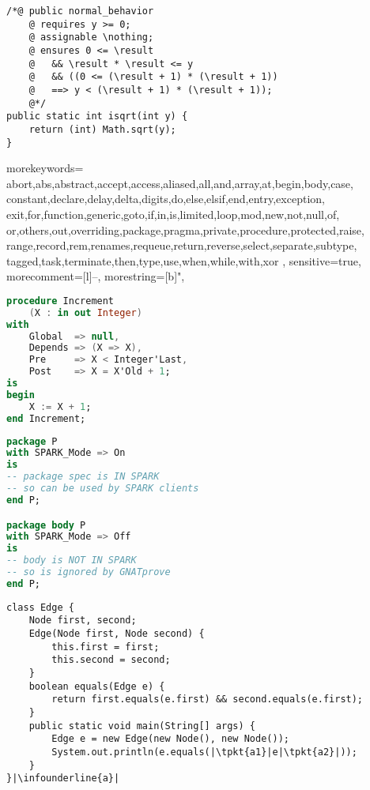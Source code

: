 \newsavebox{\jmlisqrt}
\begin{lrbox}{\jmlisqrt}
	\begin{lstlisting}
/*@ public normal_behavior
	@ requires y >= 0;
	@ assignable \nothing;
	@ ensures 0 <= \result
	@   && \result * \result <= y
	@   && ((0 <= (\result + 1) * (\result + 1))
	@   ==> y < (\result + 1) * (\result + 1));
	@*/
public static int isqrt(int y) {
	return (int) Math.sqrt(y);
}
	\end{lstlisting}
\end{lrbox}

 {
	morekeywords={
		abort,abs,abstract,accept,access,aliased,all,and,array,at,begin,body,case,
		constant,declare,delay,delta,digits,do,else,elsif,end,entry,exception,
		exit,for,function,generic,goto,if,in,is,limited,loop,mod,new,not,null,of,
		or,others,out,overriding,package,pragma,private,procedure,protected,raise,
		range,record,rem,renames,requeue,return,reverse,select,separate,subtype,
		tagged,task,terminate,then,type,use,when,while,with,xor
	},
	sensitive=true,
	morecomment=[l]--,
	morestring=[b]",
}

\newsavebox{\sparkincrement}
\begin{lrbox}{\sparkincrement}
	\begin{lstlisting}[language=ada]
procedure Increment
	(X : in out Integer)
with
	Global  => null,
	Depends => (X => X),
	Pre     => X < Integer'Last,
	Post    => X = X'Old + 1;
is
begin
	X := X + 1;
end Increment;
	\end{lstlisting}
\end{lrbox}

\newsavebox{\sparkmode}
\begin{lrbox}{\sparkmode}
	\begin{lstlisting}[language=ada]
package P
with SPARK_Mode => On
is
-- package spec is IN SPARK
-- so can be used by SPARK clients
end P;

package body P
with SPARK_Mode => Off
is
-- body is NOT IN SPARK
-- so is ignored by GNATprove
end P;
	\end{lstlisting}
\end{lrbox}

\newsavebox{\edgeruntimeerrorfix}
\begin{lrbox}{\edgeruntimeerrorfix}
	\begin{lstlisting}
class Edge {
	Node first, second;
	Edge(Node first, Node second) {
		this.first = first;
		this.second = second;
	}
	boolean equals(Edge e) {
		return first.equals(e.first) && second.equals(e.first);
	}
	public static void main(String[] args) {
		Edge e = new Edge(new Node(), new Node());
		System.out.println(e.equals(|\tpkt{a1}|e|\tpkt{a2}|));
	}
}|\infounderline{a}|
	\end{lstlisting}
\end{lrbox}

